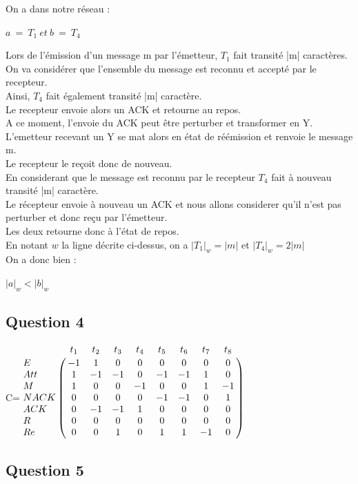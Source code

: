 On a dans notre réseau :
\begin{center}
  $a\ =\ T_1\ et\ b\ =\ T_4$
\end{center}

Lors de l'émission d'un message m par l'émetteur, $T_1$ fait transité |m| caractères.\\
On va considérer que l'ensemble du message est reconnu et accepté par le recepteur.\\
Ainsi, $T_4$ fait également transité |m| caractère.\\
Le recepteur envoie alors un ACK et retourne au repos.\\
A ce moment, l'envoie du ACK peut être perturber et transformer en Y. L'emetteur recevant un Y se mat alors en état de réémission et renvoie le message m.\\
Le recepteur le reçoit donc de nouveau.\\
En considerant que le message est reconnu par le recepteur $T_4$ fait à nouveau transité |m| caractère.\\
Le récepteur envoie à nouveau un ACK et nous allons considerer qu'il n'est pas perturber et donc reçu par l'émetteur.\\
Les deux retourne donc à l'état de repos.\\

En notant $w$ la ligne décrite ci-dessus, on a $|T_1|_w = |m|$ et $|T_4|_w = 2|m|$\\
On a donc bien :
\begin{center}
  $|a|_w < |b|_w$
\end{center}

\subsection{Question 4}

\vspace{1cm}

\begin{center}

{\Huge C}\qquad =\qquad $\bordermatrix{
    &t_1 &t_2 &t_3 &t_4 &t_5 &t_6 &t_7 &t_8\cr
E   & -1& 1 & 0 & 0 & 0 & 0 & 0 & 0\cr
Att & 1 &-1 &-1 & 0 &-1 &-1 & 1 & 0\cr
M   & 1 & 0 & 0 &-1 & 0 & 0 & 1 &-1\cr
NACK& 0 & 0 & 0 & 0 &-1 &-1 & 0 & 1\cr
ACK & 0 &-1 &-1 & 1 & 0 & 0 & 0 & 0\cr
R   & 0 & 0 & 0 & 0 & 0 & 0 & 0 & 0\cr
Re  & 0 & 0 & 1 & 0 & 1 & 1 &-1 & 0\cr
}$

\end{center}

\subsection{Question 5}


